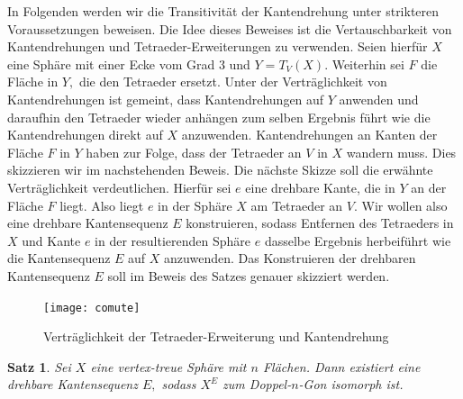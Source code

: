 \documentclass[12pt,titlepage,twoside,cleardoublepage]{article}
\theoremstyle{nummermitklammern}
\newtheorem{satz}[temp]{Satz}
\newtheorem{satz}[zahl]{Satz}
\numberwithin{equation}{section}
\begin{document}
In Folgenden werden wir die Transitivität der Kantendrehung unter strikteren Voraussetzungen beweisen. Die Idee dieses Beweises ist die Vertauschbarkeit von Kantendrehungen und Tetraeder-Erweiterungen zu verwenden. Seien hierfür $X$ eine Sphäre mit einer Ecke vom Grad 3 und $Y=T_V(X)$. Weiterhin sei $F$ die Fläche in $Y,$ die den Tetraeder ersetzt. Unter der Verträglichkeit von Kantendrehungen ist gemeint, dass Kantendrehungen auf $Y$ anwenden und daraufhin den Tetraeder wieder anhängen zum selben Ergebnis führt wie die Kantendrehungen direkt auf $X$ anzuwenden. Kantendrehungen an Kanten der Fläche $F$ in $Y$ haben zur Folge, dass der Tetraeder an $V$ in $X$ wandern muss. Dies skizzieren wir im nachstehenden Beweis. Die nächste Skizze soll die erwähnte Verträglichkeit verdeutlichen. Hierfür sei $e$ eine drehbare Kante, die in $Y$ an der Fläche $F$ liegt. Also liegt $e$ in der Sphäre $X$ am Tetraeder an $V$. Wir wollen also eine drehbare Kantensequenz $E$ konstruieren, sodass Entfernen des Tetraeders in $X$ und Kante $e$ in der resultierenden Sphäre $e$ dasselbe Ergebnis herbeiführt wie die Kantensequenz $E$ auf $X$ anzuwenden. Das Konstruieren der drehbaren Kantensequenz $E$ soll im Beweis des Satzes genauer skizziert werden.
\begin{center}
\begin{figure}[H]
\texttt{[image: comute]}
\caption{Verträglichkeit der Tetraeder-Erweiterung und Kantendrehung}
\end{figure}
\end{center}
\begin{satz}\label{3eck}
Sei $X$ eine vertex-treue Sphäre mit $n$ Flächen. Dann existiert eine drehbare Kantensequenz $E,$ sodass $X^E$ zum Doppel-$n$-Gon isomorph ist. 
\end{satz}
\end{document}
